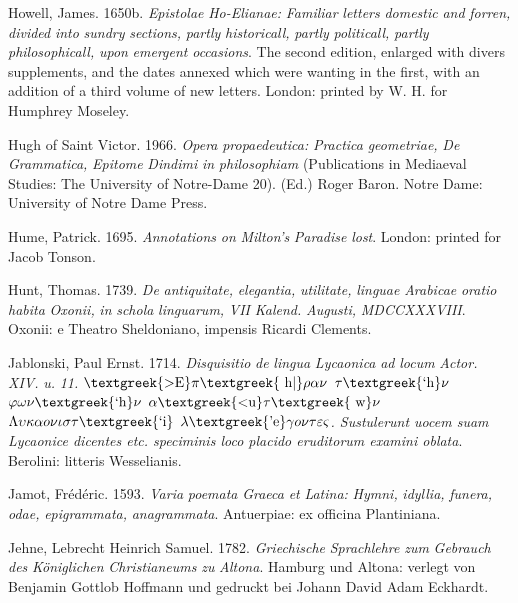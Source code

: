 \documentclass[output=paper]{langsci/langscibook}
\begin{document}
Howell, James. 1650b. \textit{Epistolae} \textit{Ho-Elianae:} \textit{Familiar} \textit{letters} \textit{domestic} \textit{and} \textit{forren,} \textit{divided} \textit{into} \textit{sundry} \textit{sections,} \textit{partly} \textit{historicall,} \textit{partly} \textit{politicall,} \textit{partly} \textit{philosophicall,} \textit{upon} \textit{emergent} \textit{occasions}. The second edition, enlarged with divers supplements, and the dates annexed which were wanting in the first, with an addition of a third volume of new letters. London: printed by W. H. for Humphrey Moseley.

Hugh of Saint Victor. 1966. \textit{Opera} \textit{propaedeutica:} \textit{Practica} \textit{geometriae,} \textit{De} \textit{Grammatica,} \textit{Epitome} \textit{Dindimi} \textit{in} \textit{philosophiam} (Publications in Mediaeval Studies: The University of Notre-Dame 20). (Ed.) Roger Baron. Notre Dame: University of Notre Dame Press.

Hume, Patrick. 1695. \textit{Annotations} \textit{on} \textit{Milton’s} \textit{Paradise} \textit{lost}. London: printed for Jacob Tonson.

Hunt, Thomas. 1739. \textit{De} \textit{antiquitate,} \textit{elegantia,} \textit{utilitate,} \textit{linguae} \textit{Arabicae} \textit{oratio} \textit{habita} \textit{Oxonii,} \textit{in} \textit{schola} \textit{linguarum,} \textit{VII} \textit{Kalend.} \textit{Augusti,} \textit{MDCCXXXVIII}. Oxonii: e Theatro Sheldoniano, impensis Ricardi Clements.

Jablonski, Paul Ernst. 1714. \textit{Disquisitio} \textit{de} \textit{lingua} \textit{Lycaonica} \textit{ad} \textit{locum} \textit{Actor.} \textit{XIV.} \textit{u.} \textit{11.} \textit{$\text{\textgreek{>E}}\pi \text{\textgreek{~h|}}\rho \alpha \nu $ $\tau \text{\textgreek{`h}}\nu $ $\varphi \omega \nu \text{\textgreek{`h}}\nu $ $\alpha \text{\textgreek{<u}}\tau \text{\textgreek{~w}}\nu $ $\Lambda \upsilon \kappa \alpha o\nu \iota \sigma \tau \text{\textgreek{`i}}$ $\lambda \text{\textgreek{'e}}\gamma o\nu \tau \varepsilon \varsigma $. Sustulerunt uocem suam Lycaonice dicentes etc. speciminis loco placido eruditorum examini oblata}. Berolini: litteris Wesselianis.

Jamot, Frédéric. 1593. \textit{Varia} \textit{poemata} \textit{Graeca} \textit{et} \textit{Latina:} \textit{Hymni,} \textit{idyllia,} \textit{funera,} \textit{odae,} \textit{epigrammata,} \textit{anagrammata}. Antuerpiae: ex officina Plantiniana.

Jehne, Lebrecht Heinrich Samuel. 1782. \textit{Griechische} \textit{Sprachlehre} \textit{zum} \textit{Gebrauch} \textit{des} \textit{Königlichen} \textit{Christianeums} \textit{zu} \textit{Altona}. Hamburg und Altona: verlegt von Benjamin Gottlob Hoffmann und gedruckt bei Johann David Adam Eckhardt.
\end{document}
